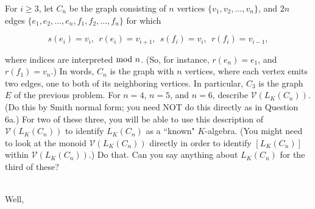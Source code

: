 For $i\geq 3$, let $C_n$ be the graph consisting of $n$ vertices $\{v_1, v_2, \hdots, v_n\}$,  and $2n$ edges 
$\{e_1, e_2, \hdots, e_n, f_1, f_2, \hdots, f_n\}$ for which 

$$s(e_i) = v_i,  \ \  r(e_i) = v_{i+1}, \ \  s(f_i) = v_i,  \ \ r(f_i) = v_{i-1},$$

where indices are interpreted ${\rm mod } \ n$.   (So, for instance, $r(e_n) = e_1$, and $r(f_1) = v_n$.)   In words, $C_n$ 
is the graph with $n$ vertices, where each vertex emits two edges, one to both of its neighboring vertices. In particular, 
$C_3$ is the graph $E$ of the previous problem. For $n=4$, $n=5$, and $n=6$, describe $\mathcal{V}(L_K(C_n))$.  
(Do this by Smith normal form; you need NOT do this directly as in Question 6a.) For two of these three, you will 
be able to use this description of $\mathcal{V}(L_K(C_n))$  to identify $L_K(C_n)$ as a ``known" $K$-algebra.   
(You might need to look at the monoid  $\mathcal{V}(L_K(C_n))$ directly in order to identify $[  L_K(C_n) ]$ within 
$\mathcal{V}(L_K(C_n))$.)  Do that. Can you say anything about $L_K(C_n)$ for the third of these?  

\begin{solution}\renewcommand{\qedsymbol}{}\ \\
    Well,
\end{solution}